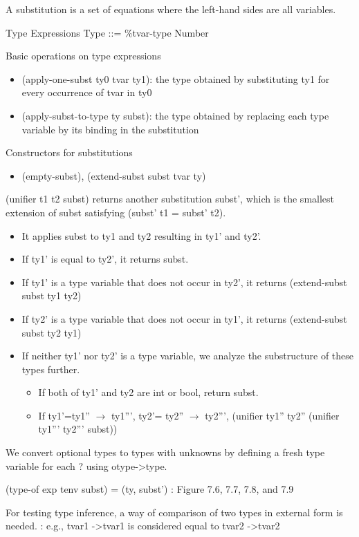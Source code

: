 \documentclass{article}
\begin{document}
\begin{huge}

A substitution is a set of equations where the left-hand sides are all variables.

Type Expressions \al
Type ::= \%tvar-type Number 

Basic operations on type expressions
\begin{itemize}
\item
(apply-one-subst ty0 tvar ty1): the type obtained by substituting ty1 for every occurrence of tvar in ty0
\item
(apply-subst-to-type ty subst): the type obtained by replacing each type variable by its binding in the substitution
\end{itemize}

Constructors for substitutions
\begin{itemize}
\item (empty-subst), (extend-subst subst tvar ty)
\end{itemize}


(unifier t1 t2 subst)
returns another substitution subst', which is the smallest extension of subst satisfying (subst' t1 = subst' t2).

\begin{itemize}
\item It applies subst to ty1 and ty2 resulting in ty1' and ty2'.
\item If ty1' is equal to ty2',  it returns subst.
\item If ty1' is a type variable that does not occur in ty2', it returns (extend-subst subst ty1 ty2)
\item If ty2' is a type variable that does not occur in ty1', it returns (extend-subst subst ty2 ty1)
\item If neither ty1' nor ty2' is a type variable, we analyze the substructure of these types further.
\begin{itemize}
\item If both of ty1' and ty2 are int or bool, return subst.
\item If ty1'=ty1'' $\rightarrow$ ty1''', ty2'= ty2'' $\rightarrow$ ty2''', 
(unifier ty1'' ty2'' (unifier ty1''' ty2''' subst))
\end{itemize}
\end{itemize}


We convert optional types to types with unknowns by defining a fresh type variable for each ? using otype-\textgreater type.

(type-of exp tenv subst) = (ty, subst') \al
: Figure 7.6, 7.7, 7.8, and 7.9

For testing type inference, a way of comparison of two types in external form is needed. \al
: e.g., tvar1 -\textgreater tvar1 is considered equal to tvar2 -\textgreater tvar2

\end{huge} 
\end{document}
